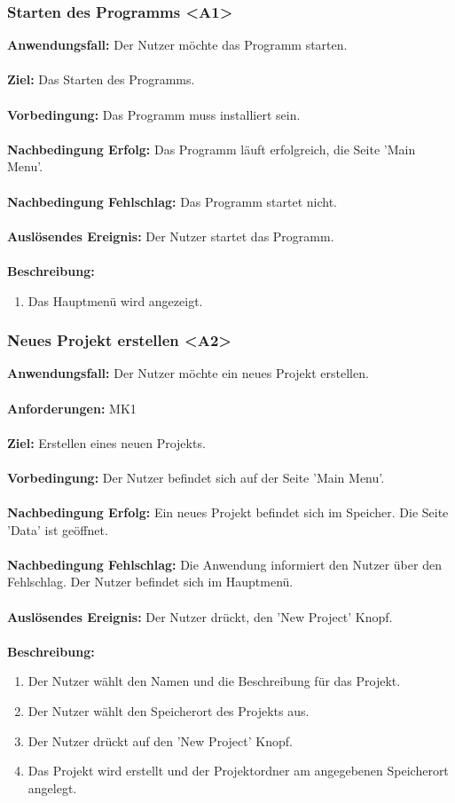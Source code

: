 \documentclass[parskip=full]{scrartcl} %
\begin{document}
\subsubsection*{Starten des Programms <A1>}
\textbf{Anwendungsfall:}  Der Nutzer möchte das Programm starten.\\\\
\textbf{Ziel:} Das Starten des Programms. \\\\
\textbf{Vorbedingung:} Das Programm muss installiert sein.  \\\\
\textbf{Nachbedingung Erfolg:} Das Programm läuft erfolgreich, die Seite 'Main Menu'.\\\\
\textbf{Nachbedingung Fehlschlag:} Das Programm startet nicht. \\\\
\textbf{Auslösendes Ereignis:} Der Nutzer startet das Programm. \\\\
\textbf{Beschreibung:}
\begin{enumerate}
    \item Das Hauptmenü wird angezeigt.
\end{enumerate}
\newpage


\subsubsection*{Neues Projekt erstellen <A2>}
\textbf{Anwendungsfall:} Der Nutzer möchte ein neues Projekt erstellen.\\\\
\textbf{Anforderungen:} MK1\\\\
\textbf{Ziel:} Erstellen eines neuen Projekts. \\\\
\textbf{Vorbedingung:} Der Nutzer befindet sich auf der Seite 'Main Menu'. \\\\
\textbf{Nachbedingung Erfolg:} Ein neues Projekt befindet sich im Speicher. Die Seite 'Data' ist geöffnet.  \\\\
\textbf{Nachbedingung Fehlschlag:} Die Anwendung informiert den Nutzer über den Fehlschlag. Der Nutzer befindet sich im Hauptmenü. \\\\
\textbf{Auslösendes Ereignis:} Der Nutzer drückt, den 'New Project' Knopf. \\\\
\textbf{Beschreibung:}
\begin{enumerate}
    \item Der Nutzer wählt den Namen und die Beschreibung für das Projekt.
    \item Der Nutzer wählt den Speicherort des Projekts aus.
    \item Der Nutzer drückt auf den 'New Project' Knopf.
    \item Das Projekt wird erstellt und der Projektordner am angegebenen Speicherort angelegt.
\end{enumerate}
\newpage
\end{document}
